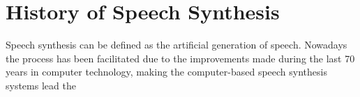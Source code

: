 \section{History of Speech Synthesis}
\label{history_speech_synthesis}
Speech synthesis can be defined as the artificial generation of speech. Nowadays the process has been facilitated due to the improvements made during the last 70 years in computer technology, making the computer-based speech synthesis systems lead the 